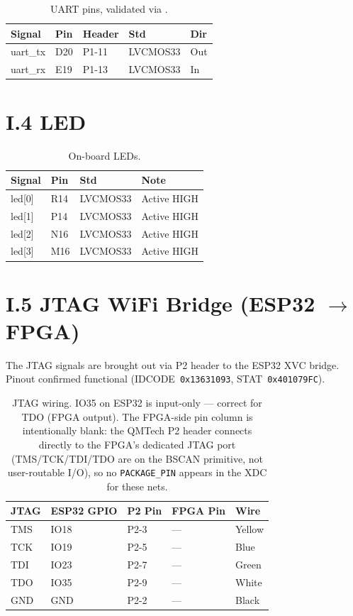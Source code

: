 \begin{table}[h]
\centering
\begin{tabular}{lllll}
\toprule
\textbf{Signal} & \textbf{Pin} & \textbf{Header} & \textbf{Std} & \textbf{Dir} \\
\midrule
uart\_tx & D20 & P1-11 & LVCMOS33 & Out \\
uart\_rx & E19 & P1-13 & LVCMOS33 & In \\
\bottomrule
\end{tabular}
\caption{UART pins, validated via .}
\end{table}

\section*{I.4 LED}
\label{sec:appI-led}

\begin{table}[h]
\centering
\begin{tabular}{llll}
\toprule
\textbf{Signal} & \textbf{Pin} & \textbf{Std} & \textbf{Note} \\
\midrule
led[0] & R14 & LVCMOS33 & Active HIGH \\
led[1] & P14 & LVCMOS33 & Active HIGH \\
led[2] & N16 & LVCMOS33 & Active HIGH \\
led[3] & M16 & LVCMOS33 & Active HIGH \\
\bottomrule
\end{tabular}
\caption{On-board LEDs.}
\end{table}

\section*{I.5 JTAG WiFi Bridge (ESP32 $\to$ FPGA)}
\label{sec:appI-jtag}

The JTAG signals are brought out via P2 header to the ESP32 XVC bridge.
Pinout confirmed functional (IDCODE~\texttt{0x13631093}, STAT~\texttt{0x401079FC}).

\begin{table}[h]
\centering
\begin{tabular}{lllll}
\toprule
\textbf{JTAG} & \textbf{ESP32 GPIO} & \textbf{P2 Pin} & \textbf{FPGA Pin} & \textbf{Wire} \\
\midrule
TMS & IO18 & P2-3 & --- & Yellow \\
TCK & IO19 & P2-5 & --- & Blue \\
TDI & IO23 & P2-7 & --- & Green \\
TDO & IO35 & P2-9 & --- & White \\
GND & GND & P2-2 & --- & Black \\
\bottomrule
\end{tabular}
\caption{JTAG wiring. IO35 on ESP32 is input-only --- correct for TDO (FPGA output). The FPGA-side pin column is intentionally blank: the QMTech P2 header connects directly to the FPGA's dedicated JTAG port (TMS/TCK/TDI/TDO are on the BSCAN primitive, not user-routable I/O), so no \texttt{PACKAGE\_PIN} appears in the XDC for these nets.}
\end{table}

